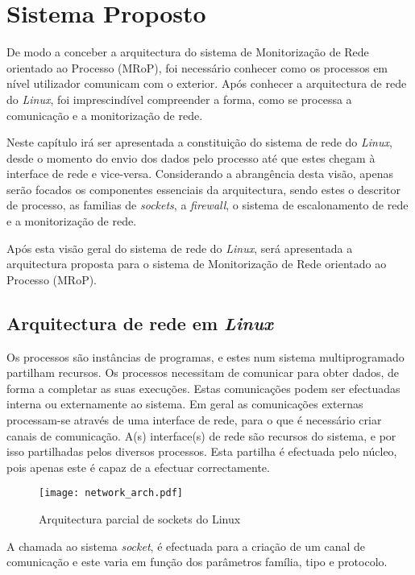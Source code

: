 \chapter{Sistema Proposto}
\label{cap:Estrutura}

De modo a conceber a arquitectura do sistema de Monitorização de Rede orientado ao Processo (MRoP), foi necessário conhecer como os processos em nível utilizador comunicam com o exterior.
Após conhecer a arquitectura de rede do \textit{Linux}, foi imprescindível compreender a forma, como se processa a comunicação e a monitorização de rede.

Neste capítulo irá ser apresentada a constituição do sistema de rede do \textit{Linux}, desde o momento do envio dos dados pelo processo até que estes chegam à interface de rede e vice-versa.
Considerando a abrangência desta visão, apenas serão focados os componentes essenciais da arquitectura, sendo estes o descritor de processo, as familias de \textit{sockets}, a \textit{firewall}, o sistema de escalonamento de rede e a monitorização de rede.

Após esta visão geral do sistema de rede do \textit{Linux}, será apresentada a arquitectura proposta para o sistema de Monitorização de Rede orientado ao Processo (MRoP).

\section{Arquitectura de rede em \textit{Linux}}
\label{sub:network}

Os processos são instâncias de programas, e estes num sistema multiprogramado partilham recursos.
Os processos necessitam de comunicar para obter dados, de forma a completar as suas execuções.
Estas comunicações podem ser efectuadas interna ou externamente ao sistema.
Em geral as comunicações externas processam-se através de uma interface de rede, para o que é necessário criar canais de comunicação.
A(s) interface(s) de rede são recursos do sistema, e por isso partilhadas pelos diversos processos.
Esta partilha é efectuada pelo núcleo, pois apenas este é capaz de a efectuar correctamente.

\begin{figure}[htbp]
\centering
\texttt{[image: network\_arch.pdf]} 
\caption{Arquitectura parcial de sockets do Linux}
\label{fig:network_arch}
\end{figure}

A chamada ao sistema \textit{socket}, é efectuada para a criação de um canal de comunicação e este varia em função dos parâmetros família, tipo e protocolo.

